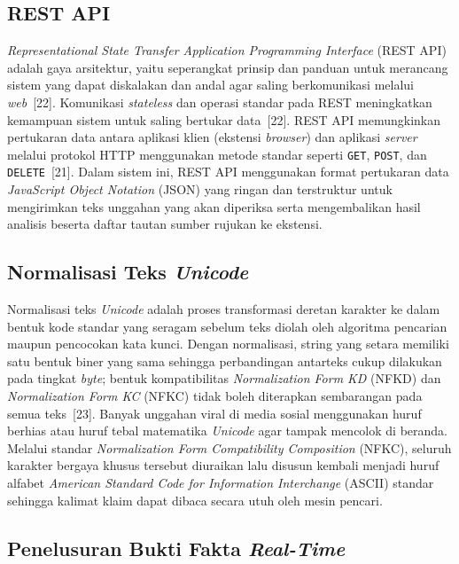\documentclass[12pt,a4paper,twoside]{report}
\begin{document}
\subsection{REST API}

\textit{Representational State Transfer Application Programming Interface} (REST API) adalah gaya arsitektur, yaitu seperangkat prinsip dan panduan untuk merancang sistem yang dapat diskalakan dan andal agar saling berkomunikasi melalui \textit{web}~[22]. Komunikasi \textit{stateless} dan operasi standar pada REST meningkatkan kemampuan sistem untuk saling bertukar data~[22]. REST API memungkinkan pertukaran data antara aplikasi klien (ekstensi \textit{browser}) dan aplikasi \textit{server} melalui protokol HTTP menggunakan metode standar seperti \texttt{GET}, \texttt{POST}, dan \texttt{DELETE}~[21]. Dalam sistem ini, REST API menggunakan format pertukaran data \textit{JavaScript Object Notation} (JSON) yang ringan dan terstruktur untuk mengirimkan teks unggahan yang akan diperiksa serta mengembalikan hasil analisis beserta daftar tautan sumber rujukan ke ekstensi.

\subsection{Normalisasi Teks \textit{Unicode}}

Normalisasi teks \textit{Unicode} adalah proses transformasi deretan karakter ke dalam bentuk kode standar yang seragam sebelum teks diolah oleh algoritma pencarian maupun pencocokan kata kunci. Dengan normalisasi, string yang setara memiliki satu bentuk biner yang sama sehingga perbandingan antarteks cukup dilakukan pada tingkat \textit{byte}; bentuk kompatibilitas \textit{Normalization Form KD} (NFKD) dan \textit{Normalization Form KC} (NFKC) tidak boleh diterapkan sembarangan pada semua teks~[23]. Banyak unggahan viral di media sosial menggunakan huruf berhias atau huruf tebal matematika \textit{Unicode} agar tampak mencolok di beranda. Melalui standar \textit{Normalization Form Compatibility Composition} (NFKC), seluruh karakter bergaya khusus tersebut diuraikan lalu disusun kembali menjadi huruf alfabet \textit{American Standard Code for Information Interchange} (ASCII) standar sehingga kalimat klaim dapat dibaca secara utuh oleh mesin pencari.

\subsection{Penelusuran Bukti Fakta \textit{Real-Time}}
\end{document}
